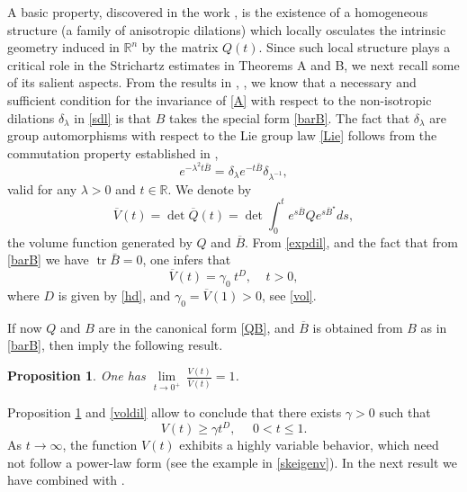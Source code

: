 \documentclass[11pt,letter]{amsart}
\def \R {\mathbb{R}}
\newcommand{\Rn}{\mathbb R^n}
\newcommand{\la}{\lambda}
\numberwithin{equation}{section}
\newcommand{\tr}{\operatorname{tr}}
\newtheorem{proposition}[theorem]{Proposition}
\numberwithin{equation}{section}
\begin{document}
A basic property, discovered in the work \cite{LP}, is the existence of a homogeneous structure (a family of anisotropic dilations) which locally osculates the intrinsic geometry induced in $\Rn$ by the matrix $Q(t)$. Since such local structure plays a critical role in the Strichartz estimates in Theorems A and B, we next recall some of its salient aspects. 
From the results in \cite{Ku, Ku2}, \cite{LP}, we know that a necessary and sufficient condition for the invariance of \eqref{A} with respect to the non-isotropic dilations $\delta_\la$ in \eqref{sdl} is that $B$ takes the special form \eqref{barB}. 
The fact that $\delta_\lambda$ are group automorphisms with respect to the Lie group law \eqref{Lie} follows from the commutation property established in \cite[p.288]{Ku2}, 
\begin{equation}\label{expdil}
e^{-\lambda^2 t \bar B}=\delta_\lambda e^{-t \bar B}\delta_{\lambda^{-1}},
\end{equation}
valid for any $\lambda>0$ and $t\in\R$.
We denote by 
\[
\overline V(t) = \det \overline Q(t) = \det \int_0^t e^{s\overline B} Q e^{s \overline B^\star} ds,
\]
the volume function generated by $Q$ and $\overline B$. From \eqref{expdil}, and the fact that from \eqref{barB} we have $\tr \bar B = 0$, one infers that 
\begin{equation}\label{voldil}
\overline V(t) = \gamma_0\ t^{D},\ \ \ \ \ t>0,
\end{equation}
where $D$ is given by \eqref{hd}, and $\gamma_0 = \overline V(1) > 0$, see \eqref{vol}. 

If now $Q$ and $B$ are in the canonical form \eqref{QB}, and $\overline B$ is obtained from $B$ as in \eqref{barB}, then \cite[(3.14) and Remark 3.1]{LP} imply the following result.

\begin{proposition}\label{P:asy}
One has
$\underset{t\to 0^+}{\lim}\ \frac{V(t)}{\overline V(t)} = 1$.
\end{proposition}
Proposition \ref{P:asy} and \eqref{voldil} allow to conclude that there exists $\gamma>0$ such that  
\begin{equation}\label{vicinoa0}
V(t) \ge \gamma t^D,\ \ \ \ \ \ 0<t\le 1.
\end{equation}
As $t\to \infty$, the function $V(t)$ exhibits a highly variable behavior, which need not follow a power-law form (see the example in \eqref{skeigenv}).
In the next result we have combined \cite[Prop. 3.1]{GTma} with \cite[Prop. 2.3]{BGT}.
\end{document}
